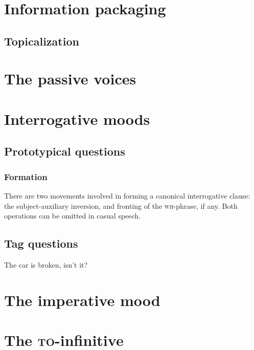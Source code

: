 \documentclass[UTF8, a4paper, oneside, scheme=plain]{ctexrep}
\newcommand{\corpuscat}[1]{\textsc{#1}}
\begin{document}
\section{Information packaging}

\subsection{Topicalization}\label{sec:simple-clause.information.topicalization}

\section{The passive voices}\label{sec:simple-clause.voice}


\section{Interrogative moods}

\subsection{Prototypical questions}

\subsubsection{Formation}\label{sec:simple-clause.interrogative.formation}

There are two movements involved in forming a canonical interrogative clause:
the subject-auxiliary inversion,
and fronting of the \corpuscat{wh}-phrase, if any.
Both operations can be omitted in casual speech.

\subsection{Tag questions}

\begin{exe}
    \ex The car is broken, isn't it?
\end{exe}

\section{The imperative mood}

\section{The \corpuscat{to}-infinitive}
\end{document}

